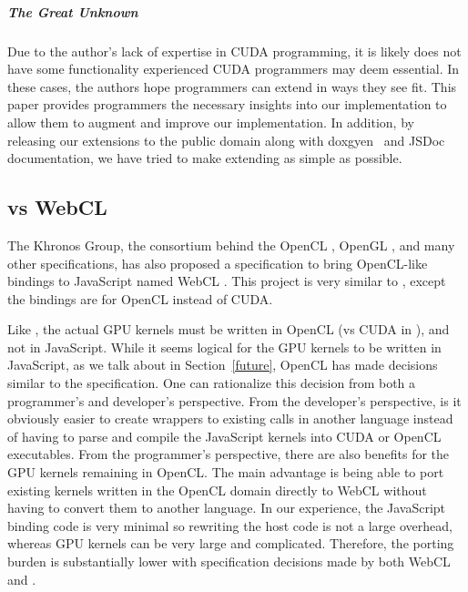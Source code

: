 \subparagraph{The Great Unknown} Due to the author's lack of expertise in CUDA
programming, it is likely \name does not have some functionality experienced
CUDA programmers may deem essential. In these cases, the authors hope
programmers can extend \name in ways they see fit.  This paper provides
programmers the necessary insights into our implementation to allow them to
augment and improve our implementation. In addition, by releasing our extensions
to the public domain along with doxgyen~\cite{doxygen} and JSDoc~\cite{JSDOC}
documentation, we have tried to make extending \name as simple as possible.



\subsection{\name vs WebCL}
\label{webCLDisc}
The Khronos Group, the consortium behind the OpenCL
\cite{openCL}, OpenGL \cite{openGL}, and many other specifications, has also
proposed a specification to bring OpenCL-like bindings to JavaScript named WebCL
\cite{webCLSpec}. This project is very similar to \namens, except the bindings are for
OpenCL instead of CUDA.

Like \namens, the actual GPU kernels must be written in OpenCL (vs CUDA in
\namens), and not in JavaScript. While it seems logical for the GPU kernels to
be written in JavaScript, as we talk about in Section~\ref{future}, OpenCL has
made decisions similar to the \name specification. One can rationalize this
decision from both a programmer's and developer's perspective. From the
developer's perspective, is it obviously easier to create wrappers to existing
calls in another language instead of having to parse and compile the JavaScript
kernels into CUDA or OpenCL executables. From the programmer's perspective, there
are also benefits for the GPU kernels remaining in OpenCL. The main advantage is
being able to port existing kernels written in the OpenCL domain directly to
WebCL without having to convert them to another language. In our experience, the
JavaScript binding code is very minimal so rewriting the host code is not a
large overhead, whereas GPU kernels can be very large and complicated.
Therefore, the porting burden is substantially lower with specification
decisions made by both WebCL and \namens.

